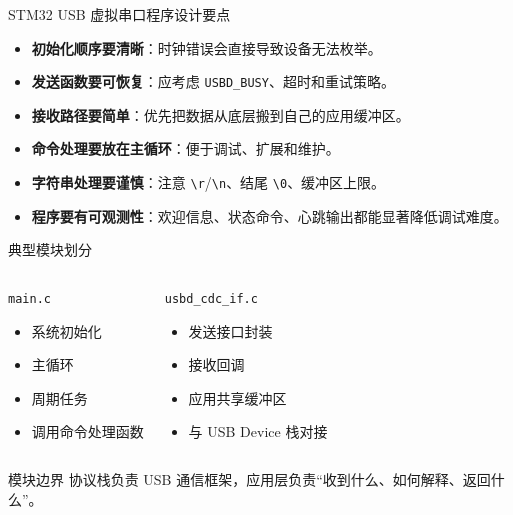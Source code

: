 \documentclass[11pt,aspectratio=169]{ctexbeamer}
\newcommand{\code}[1]{\texttt{#1}}
\newcommand{\term}[1]{\textbf{\color{PrimaryBlue}#1}}
\begin{document}
\begin{frame}{STM32 USB 虚拟串口程序设计要点}
  \small
  \begin{itemize}
    \item \term{初始化顺序要清晰}：时钟错误会直接导致设备无法枚举。
    \item \term{发送函数要可恢复}：应考虑 \code{USBD\_BUSY}、超时和重试策略。
    \item \term{接收路径要简单}：优先把数据从底层搬到自己的应用缓冲区。
    \item \term{命令处理要放在主循环}：便于调试、扩展和维护。
    \item \term{字符串处理要谨慎}：注意 \code{\textbackslash r}/\code{\textbackslash n}、结尾 \code{\textbackslash0}、缓冲区上限。
    \item \term{程序要有可观测性}：欢迎信息、状态命令、心跳输出都能显著降低调试难度。
  \end{itemize}
\end{frame}

\begin{frame}{典型模块划分}
  \begin{columns}[T]
    \begin{block}{\code{main.c}}
      \begin{itemize}
        \item 系统初始化
        \item 主循环
        \item 周期任务
        \item 调用命令处理函数
      \end{itemize}
    \end{block}

    \begin{block}{\code{usbd\_cdc\_if.c}}
      \begin{itemize}
        \item 发送接口封装
        \item 接收回调
        \item 应用共享缓冲区
        \item 与 USB Device 栈对接
      \end{itemize}
    \end{block}
  \end{columns}

  \vspace{0.5em}
  \begin{alertblock}{模块边界}
    协议栈负责 USB 通信框架，应用层负责“收到什么、如何解释、返回什么”。
  \end{alertblock}
\end{frame}
\end{document}
